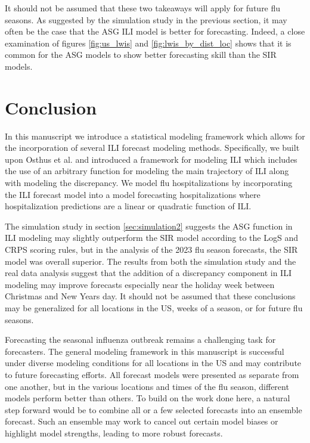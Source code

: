 It should not be assumed that these two takeaways will apply for future flu 
seasons. As suggested by the simulation study in the previous section, it may 
often be the case that the ASG ILI model is better for forecasting. Indeed, a 
close examination of figures \ref{fig:us_lwis} and \ref{fig:lwis_by_dist_loc} 
shows that it is common for the ASG models to show better forecasting skill 
than the SIR models.








\section{Conclusion}
\label{sec:conclusion}

 In this manuscript we introduce a statistical modeling framework which allows 
 for the incorporation of several ILI forecast modeling methods. Specifically, 
 we built upon Osthus et al. \cite[]{osthus2019dynamic} and introduced a 
 framework for modeling ILI which includes the use of an arbitrary function 
 for modeling the main trajectory of ILI along with modeling the discrepancy. 
 We model flu hospitalizations by incorporating the ILI forecast model into a 
 model forecasting hospitalizations where hospitalization predictions are a 
 linear or quadratic function of ILI.

The simulation study in section \ref{sec:simulation2} suggests the ASG 
function in ILI modeling may slightly outperform the SIR model according to 
the LogS and CRPS scoring rules, but in the analysis of the 2023 flu season 
forecasts, the SIR model was overall superior. The results from both the 
simulation study and the real data analysis suggest that the addition of a 
discrepancy component in ILI modeling may improve forecasts especially near 
the holiday week between Christmas and New Years day. It should not be assumed 
that these conclusions may be generalized for all locations in the US, weeks 
of a season, or for future flu seasons. 

Forecasting the seasonal influenza outbreak remains a challenging task for 
forecasters. The general modeling framework in this manuscript is successful 
under diverse modeling conditions for all locations in the US and may 
contribute to future forecasting efforts. All forecast models were presented 
as separate from one another, but in the various locations and times of the 
flu season, different models perform better than others. To build on the work 
done here, a natural step forward would be to combine all or a few selected 
forecasts into an ensemble forecast. Such an ensemble may work to cancel out 
certain model biases or highlight model strengths, leading to more robust 
forecasts. 
